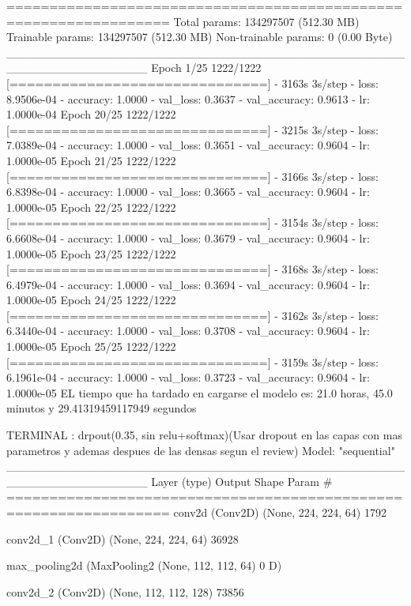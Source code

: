 \documentclass[11pt, a4paper]{article} %
\begin{document}
=================================================================
Total params: 134297507 (512.30 MB)
Trainable params: 134297507 (512.30 MB)
Non-trainable params: 0 (0.00 Byte)
_________________________________________________________________
Epoch 1/25
1222/1222 [==============================] - 3163s 3s/step - loss: 8.9506e-04 - accuracy: 1.0000 - val_loss: 0.3637 - val_accuracy: 0.9613 - lr: 1.0000e-04
Epoch 20/25
1222/1222 [==============================] - 3215s 3s/step - loss: 7.0389e-04 - accuracy: 1.0000 - val_loss: 0.3651 - val_accuracy: 0.9604 - lr: 1.0000e-05
Epoch 21/25
1222/1222 [==============================] - 3166s 3s/step - loss: 6.8398e-04 - accuracy: 1.0000 - val_loss: 0.3665 - val_accuracy: 0.9604 - lr: 1.0000e-05
Epoch 22/25
1222/1222 [==============================] - 3154s 3s/step - loss: 6.6608e-04 - accuracy: 1.0000 - val_loss: 0.3679 - val_accuracy: 0.9604 - lr: 1.0000e-05
Epoch 23/25
1222/1222 [==============================] - 3168s 3s/step - loss: 6.4979e-04 - accuracy: 1.0000 - val_loss: 0.3694 - val_accuracy: 0.9604 - lr: 1.0000e-05
Epoch 24/25
1222/1222 [==============================] - 3162s 3s/step - loss: 6.3440e-04 - accuracy: 1.0000 - val_loss: 0.3708 - val_accuracy: 0.9604 - lr: 1.0000e-05
Epoch 25/25
1222/1222 [==============================] - 3159s 3s/step - loss: 6.1961e-04 - accuracy: 1.0000 - val_loss: 0.3723 - val_accuracy: 0.9604 - lr: 1.0000e-05
EL tiempo que ha tardado en cargarse el modelo es: 21.0 horas, 45.0 minutos y 29.41319459117949 segundos



TERMINAL : drpout(0.35, sin relu+softmax)(Usar dropout en las capas con mas parametros y ademas despues de las densas segun el review)
Model: "sequential"
_________________________________________________________________
 Layer (type)                Output Shape              Param #   
=================================================================
 conv2d (Conv2D)             (None, 224, 224, 64)      1792      
                                                                 
 conv2d_1 (Conv2D)           (None, 224, 224, 64)      36928     
                                                                 
 max_pooling2d (MaxPooling2  (None, 112, 112, 64)      0         
 D)                                                              
                                                                 
 conv2d_2 (Conv2D)           (None, 112, 112, 128)     73856     
                                                                 
\end{document}
